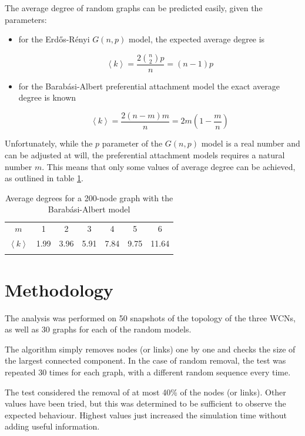 \documentclass[a4paper,11pt,twoside,openright]{memoir}
\begin{document}
The average degree of random graphs can be predicted easily, given the
parameters:

\begin{itemize}
\item
  for the Erd\H{o}s-Rényi $G(n,p)$ model, the expected average degree is

  \begin{equation}
  \left< k \right> = \frac{2 \binom{n}{2} p}{n} = (n-1)p
  \end{equation}
\item
  for the Barabási-Albert preferential attachment model the exact
  average degree is known

  \begin{equation}
  \left< k \right> = \frac{2 (n-m)m}{n} = 2m\left( 1 - \frac{m}{n} \right)
  \end{equation}
\end{itemize}

Unfortunately, while the $p$ parameter of the $G(n,p)$ model is a real
number and can be adjusted at will, the preferential attachment models
requires a natural number $m$. This means that only some values of
average degree can be achieved, as outlined in table \ref{tbl:b-a_degrees}.

\begin{longtable}[c]{@{}ccccccc@{}}
\toprule\addlinespace
$m$ & 1 & 2 & 3 & 4 & 5 & 6
\\\addlinespace
$\left< k \right>$ & 1.99 & 3.96 & 5.91 & 7.84 & 9.75 & 11.64
\\\addlinespace
\bottomrule
\addlinespace
\caption{Average degrees for a 200-node graph with the Barabási-Albert
model}
\label{tbl:b-a_degrees}
\end{longtable}

\section{Methodology}\label{methodology}

The analysis was performed on 50 snapshots of the topology of the three
WCNs, as well as 30 graphs for each of the random models.

The algorithm simply removes nodes (or links) one by one and checks the
size of the largest connected component. In the case of random removal,
the test was repeated 30 times for each graph, with a different random
sequence every time.

The test considered the removal of at most 40\% of the nodes (or links).
Other values have been tried, but this was determined to be sufficient
to observe the expected behaviour. Highest values just increased the
simulation time without adding useful information.
\end{document}
